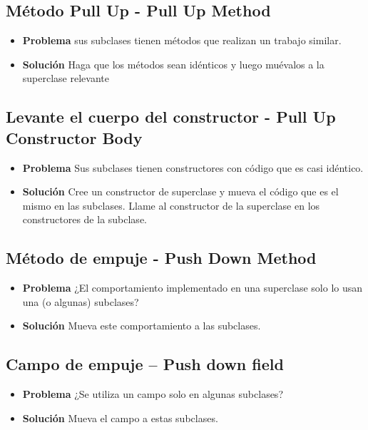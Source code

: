 \documentclass[11pt,a4paper,oneside]{book}
\begin{document}
\subsection{Método Pull Up - Pull Up Method}
\label{pullupmethod}
\begin{itemize}
    \item \textbf{Problema} sus subclases tienen métodos que realizan un trabajo similar.
    \item \textbf{Solución} Haga que los métodos sean idénticos y luego muévalos a la superclase relevante
\end{itemize}

\subsection{Levante el cuerpo del constructor - Pull Up Constructor Body}
\label{pullupconstructorbody}
\begin{itemize}
    \item \textbf{Problema} Sus subclases tienen constructores con código que es casi idéntico.
    \item \textbf{Solución} Cree un constructor de superclase y mueva el código que es el mismo en las subclases. Llame al constructor de la superclase en los constructores de la subclase.
\end{itemize}


\subsection{Método de empuje - Push Down Method}
\label{pushdownmethod}
\begin{itemize}
    \item \textbf{Problema} ¿El comportamiento implementado en una superclase solo lo usan una (o algunas) subclases?
    \item \textbf{Solución} Mueva este comportamiento a las subclases.
\end{itemize}

\subsection{Campo de empuje – Push down field}
\label{pushdownfield}
\begin{itemize}
    \item \textbf{Problema} ¿Se utiliza un campo solo en algunas subclases?
    \item \textbf{Solución} Mueva el campo a estas subclases.
\end{itemize}
\end{document}
